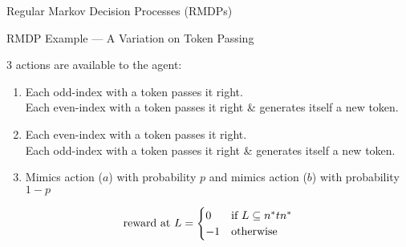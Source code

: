 \documentclass[
    hyperref = {hidelinks, linkcolor = black},
    xcolor = {dvipsnames},
    10pt
    aspectration = 169
]{beamer}
\begin{document}
\begin{frame}{Regular Markov Decision Processes (RMDPs)}
\begin{center}
        \end{center}
    \end{frame}

    \begin{frame}{RMDP Example --- A Variation on Token Passing}
        \footnotesize

        3 actions are available to the agent:
            \begin{enumerate}[label = ($\alph*$)]
                \item
                    Each odd-index with a token passes it right.\\
                    Each even-index with a token passes it right \& generates itself a new token.
                \item
                    Each even-index with a token passes it right.\\
                    Each odd-index with a token passes it right \& generates itself a new token.
                \item
                    Mimics action ($a$) with probability $p$ and mimics action ($b$) with probability $1-p$
            \end{enumerate}

        \begin{equation*}
            \textup{reward at } L = \begin{cases}
                0 &\textup{if } L \subseteq n^* t n^* \\
                -1 &\textup{otherwise}
            \end{cases}
        \end{equation*}

        \begin{figure}
            \centering
            \begin{subfigure}{0.5\linewidth}
                \centering
\end{subfigure}
\end{figure}
\end{frame}
\end{document}
